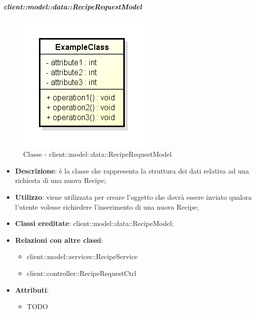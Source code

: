 		\subparagraph{client::model::data::RecipeRequestModel} %
		\label{subp:client_model_data_reciperequestmodel}
			\begin{figure}[htbp]
				\centering
				\centerline{\includegraphics[scale=0.7]{./images/client/classes/example_class.png}}
				\caption{Classe - client::model::data::RecipeRequestModel}
			\end{figure}
			\begin{itemize}
				\item \textbf{Descrizione}: è la classe che rappresenta la struttura dei dati relativa ad una richiesta di una nuova Recipe;
				\item \textbf{Utilizzo}: viene utilizzata per creare l'oggetto che dovrà essere inviato qualora l'utente volesse richiedere l'inserimento di una nuova Recipe;
				\item \textbf{Classi ereditate}: client::model::data::RecipeModel;
				\item \textbf{Relazioni con altre classi}:
					\begin{itemize}
						\item client::model::services::RecipeService
						\item client::controller::RecipeRequestCtrl
					\end{itemize}
				\item \textbf{Attributi}:
					\begin{itemize}
						\item TODO
					\end{itemize}
			\end{itemize}


